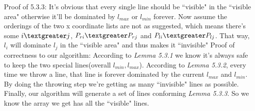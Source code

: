 \documentclass[11pt]{article}
\begin{document}
	\newline
	Proof of 5.3.3: It's obvious that every single line should be ``visible" in the ``visible area" otherwise it'll be dominated by $l_{max}$ or $l_{min}$ forever. Now assume the orderings of the two x coordinate lists are not as suggested, which means there's some $i\textgreater j$, $P_{ri}\textgreater P_{rj}$ and $P_{li}\textgreater P_{lj}$. That way, $l_{i}$ will dominate $l_{j}$ in the ``visible area" and thus makes it ``invisible"\newline
	\newline
	Proof of correctness to our algorithm: According to \textit{Lemma 5.3.1} we know it's always safe to keep the two special lines(overall $l_{min}, l_{max}$). According to \textit{Lemma 5.3.2}, every time we throw a line, that line is forever dominated by the current $l_{max}$ and $l_{min}$. By doing the throwing step we're getting as many ``invisible" lines as possible. Finally, our algorithm will generate a set of lines conforming \textit{Lemma 5.3.3}. So we know the array we get has all the ``visible" lines.
\end{document}
